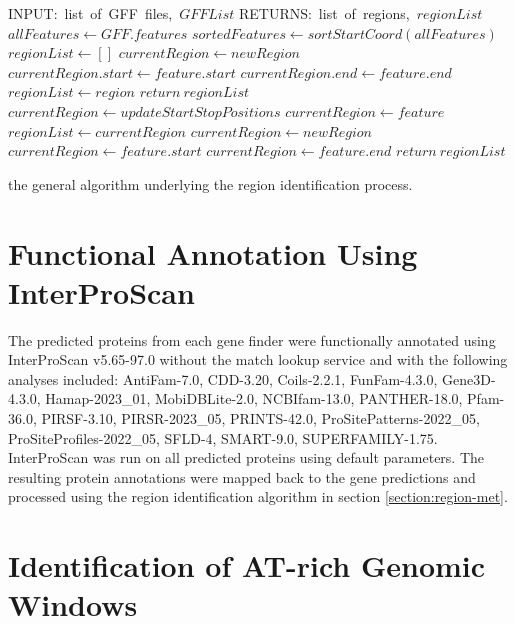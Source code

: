 \begin{algorithm}
  \begin{algorithmic}
    \State INPUT:\ list\ of\ GFF\ files,\ $GFFList$
    \State RETURNS:\ list\ of\ regions,\ $regionList$
    \State $allFeatures \gets GFF.features$
    \EndFor
    \State $sortedFeatures \gets sortStartCoord(allFeatures)$
    \State $regionList \gets []$
        \State $currentRegion \gets newRegion$
        \State $currentRegion.start \gets feature.start$
        \State $currentRegion.end \gets feature.end$
        \State $regionList \gets region$
        \State $return\ regionList$
        \State $currentRegion \gets updateStartStopPositions$
        \State $currentRegion \gets feature$
      \Else
        \State $regionList \gets currentRegion$
        \State $currentRegion \gets newRegion$
        \State $currentRegion \gets feature.start$
        \State $currentRegion \gets feature.end$
      \EndIf
    \EndFor
    \State $return\ regionList$
  \end{algorithmic}
  \caption{the general algorithm underlying the region identification
    process.}
  \label{alg:regions}
\end{algorithm}

\section{Functional Annotation Using InterProScan}

The predicted proteins from each gene finder were functionally
annotated using InterProScan
v5.65-97.0\cite{10.1093/bioinformatics/btu031} without the match
lookup service and with the following analyses included: AntiFam-7.0,
CDD-3.20, Coils-2.2.1, FunFam-4.3.0, Gene3D-4.3.0, Hamap-2023\_01,
MobiDBLite-2.0, NCBIfam-13.0, PANTHER-18.0, Pfam-36.0, PIRSF-3.10,
PIRSR-2023\_05, PRINTS-42.0, ProSitePatterns-2022\_05,
ProSiteProfiles-2022\_05, SFLD-4, SMART-9.0,
SUPERFAMILY-1.75. InterProScan was run on all predicted proteins using
default parameters. The resulting protein annotations were mapped back
to the gene predictions and processed using the region identification
algorithm in section \ref{section:region-met}.

\section{Identification of AT-rich Genomic Windows}

